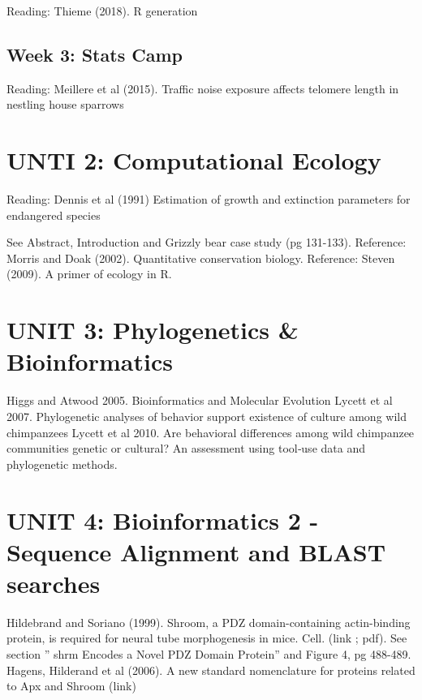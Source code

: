 \documentclass[
]{book}
\begin{document}
Reading: Thieme (2018). R generation

\hypertarget{week-3-stats-camp}{%
\subsection{Week 3: Stats Camp}\label{week-3-stats-camp}}

Reading: Meillere et al (2015). Traffic noise exposure affects telomere length in nestling house sparrows

\hypertarget{unti-2-computational-ecology}{%
\section{UNTI 2: Computational Ecology}\label{unti-2-computational-ecology}}

Reading: Dennis et al (1991) Estimation of growth and extinction parameters for endangered species

See Abstract, Introduction and Grizzly bear case study (pg 131-133).
Reference: Morris and Doak (2002). Quantitative conservation biology.
Reference: Steven (2009). A primer of ecology in R.

\hypertarget{unit-3-phylogenetics-bioinformatics}{%
\section{UNIT 3: Phylogenetics \& Bioinformatics}\label{unit-3-phylogenetics-bioinformatics}}

Higgs and Atwood 2005. Bioinformatics and Molecular Evolution
Lycett et al 2007. Phylogenetic analyses of behavior support existence of culture among wild
chimpanzees
Lycett et al 2010. Are behavioral differences among wild chimpanzee communities genetic or
cultural? An assessment using tool‐use data and phylogenetic methods.

\hypertarget{unit-4-bioinformatics-2---sequence-alignment-and-blast-searches}{%
\section{UNIT 4: Bioinformatics 2 - Sequence Alignment and BLAST searches}\label{unit-4-bioinformatics-2---sequence-alignment-and-blast-searches}}

Hildebrand and Soriano (1999). Shroom, a PDZ domain-containing actin-binding protein, is
required for neural tube morphogenesis in mice. Cell. (link ; pdf). See section '' shrm
Encodes a Novel PDZ Domain Protein'' and Figure 4, pg 488-489.
Hagens, Hilderand et al (2006). A new standard nomenclature for proteins related to Apx and
Shroom (link)
\end{document}
